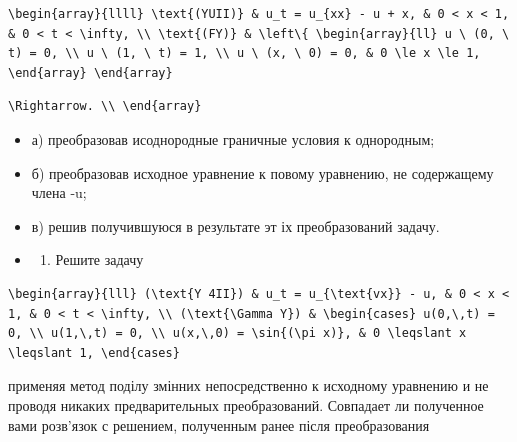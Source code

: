 \documentclass[
  ukrainian,
]{article}
\providecommand{\tightlist}{%
  \setlength{\itemsep}{0pt}\setlength{\parskip}{0pt}}
\begin{document}
\begin{verbatim}
\begin{array}{llll} \text{(YUII)} & u_t = u_{xx} - u + x, & 0 < x < 1, & 0 < t < \infty, \\ \text{(FY)} & \left\{ \begin{array}{ll} u \ (0, \ t) = 0, \\ u \ (1, \ t) = 1, \\ u \ (x, \ 0) = 0, & 0 \le x \le 1, \end{array} \end{array}
\end{verbatim}

\begin{verbatim}
\Rightarrow. \\ \end{array}
\end{verbatim}

\begin{itemize}
\item
  а) преобразовав исоднородные граничные условия к однородным;
\item
  б) преобразовав исходное уравнение к повому уравнению, не содержащему
  члена -u;
\item
  в) решив получившуюся в результате эт іх преобразований задачу.
\item
  \begin{enumerate}
  \def\labelenumi{\arabic{enumi}.}
  \setcounter{enumi}{2}
  \tightlist
  \item
    Решите задачу
  \end{enumerate}
\end{itemize}

\begin{verbatim}
\begin{array}{lll} (\text{Y 4II}) & u_t = u_{\text{vx}} - u, & 0 < x < 1, & 0 < t < \infty, \\ (\text{\Gamma Y}) & \begin{cases} u(0,\,t) = 0, \\ u(1,\,t) = 0, \\ u(x,\,0) = \sin{(\pi x)}, & 0 \leqslant x \leqslant 1, \end{cases}
\end{verbatim}

применяя метод поділу змінних непосредственно к исходному уравнению и не
проводя никаких предварительных преобразований. Совпадает ли полученное
вами розв'язок с решением, полученным ранее після преобразования
\end{document}
